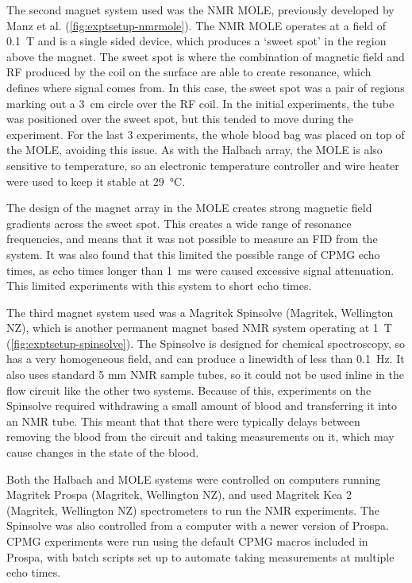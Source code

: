 The second magnet system used was the NMR MOLE, previously developed by Manz et al.\cite{ManzmobileonesidedNMR2006} (\autoref{fig:exptsetup-nmrmole}).
The NMR MOLE operates at a field of \SI{0.1}{T} and is a single sided device, which produces a `sweet spot' in the region above the magnet.
The sweet spot is where the combination of magnetic field and RF produced by the coil on the surface are able to create resonance, which defines where signal comes from.
In this case, the sweet spot was a pair of regions marking out a \SI{3}{cm} circle over the RF coil.
In the initial experiments, the tube was positioned over the sweet spot, but this tended to move during the experiment.
For the last 3 experiments, the whole blood bag was placed on top of the MOLE, avoiding this issue.
As with the Halbach array, the MOLE is also sensitive to temperature, so an electronic temperature controller and wire heater were used to keep it stable at \SI{29}{\celsius}.

The design of the magnet array in the MOLE creates strong magnetic field gradients across the sweet spot.
This creates a wide range of resonance frequencies, and means that it was not possible to measure an FID from the system.
It was also found that this limited the possible range of CPMG echo times, as echo times longer than \SI{1}{ms} were caused excessive signal attenuation.
This limited experiments with this system to short echo times.

The third magnet system used was a Magritek Spinsolve (Magritek, Wellington NZ), which is another permanent magnet based NMR system operating at \SI{1}{T} (\autoref{fig:exptsetup-spinsolve}).
The Spinsolve is designed for chemical spectroscopy, so has a very homogeneous field, and can produce a linewidth of less than \SI{0.1}{Hz}.
It also uses standard 5 mm NMR sample tubes, so it could not be used inline in the flow circuit like the other two systems.
Because of this, experiments on the Spinsolve required withdrawing a small amount of blood and transferring it into an NMR tube.
This meant that that there were typically delays between removing the blood from the circuit and taking measurements on it, which may cause changes in the state of the blood.

Both the Halbach and MOLE systems were controlled on computers running Magritek Prospa (Magritek, Wellington NZ), and used Magritek Kea 2 (Magritek, Wellington NZ) spectrometers to run the NMR experiments.
The Spinsolve was also controlled from a computer with a newer version of Prospa.
CPMG experiments were run using the default CPMG macros included in Prospa, with batch scripts set up to automate taking measurements at multiple echo times.

